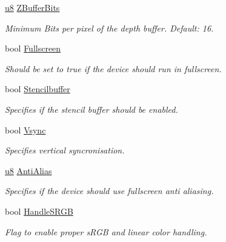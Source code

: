 \begin{DoxyCompactItemize}
\mbox{\label{structirr_1_1SIrrlichtCreationParameters_ad34136ed6cd1532ed4e112f7ad72cbcf}} 
\hyperlink{namespaceirr_a646874f69af8ff87fc10201b0254a761}{u8} \hyperlink{structirr_1_1SIrrlichtCreationParameters_ad34136ed6cd1532ed4e112f7ad72cbcf}{Z\+Buffer\+Bits}
\begin{DoxyCompactList}\small\item\em Minimum Bits per pixel of the depth buffer. Default\+: 16. \end{DoxyCompactList}\item 
bool \hyperlink{structirr_1_1SIrrlichtCreationParameters_a40c03ef099d60cec514697baf0b64214}{Fullscreen}
\begin{DoxyCompactList}\small\item\em Should be set to true if the device should run in fullscreen. \end{DoxyCompactList}\item 
bool \hyperlink{structirr_1_1SIrrlichtCreationParameters_a8120cfeac3fbf8b12b1e5f6bd6a8ec2f}{Stencilbuffer}
\begin{DoxyCompactList}\small\item\em Specifies if the stencil buffer should be enabled. \end{DoxyCompactList}\item 
bool \hyperlink{structirr_1_1SIrrlichtCreationParameters_a33b07682f12db0d2c2c3a7bf74f64387}{Vsync}
\begin{DoxyCompactList}\small\item\em Specifies vertical syncronisation. \end{DoxyCompactList}\item 
\hyperlink{namespaceirr_a646874f69af8ff87fc10201b0254a761}{u8} \hyperlink{structirr_1_1SIrrlichtCreationParameters_a50602e6ae0cc3d79ca7df0aa8114e75a}{Anti\+Alias}
\begin{DoxyCompactList}\small\item\em Specifies if the device should use fullscreen anti aliasing. \end{DoxyCompactList}\item 
bool \hyperlink{structirr_1_1SIrrlichtCreationParameters_a4808090b31a2a0e004066bded7bfefc6}{Handle\+S\+R\+GB}
\begin{DoxyCompactList}\small\item\em Flag to enable proper s\+R\+GB and linear color handling. \end{DoxyCompactList}\item 

\end{DoxyCompactItemize}
